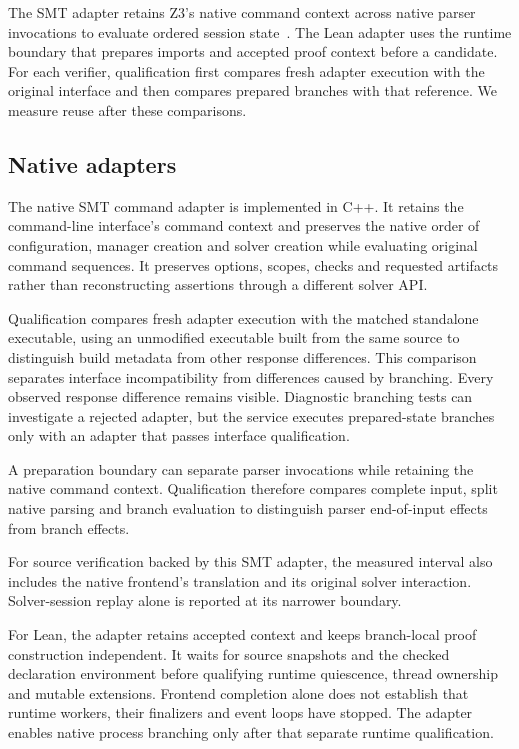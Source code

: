 \documentclass[10pt,twocolumn]{article}
\begin{document}
The SMT adapter retains Z3's native command context across native parser invocations to evaluate ordered session state~\cite{z3api}. The Lean adapter uses the runtime boundary that prepares imports and accepted proof context before a candidate. For each verifier, qualification first compares fresh adapter execution with the original interface and then compares prepared branches with that reference. We measure reuse after these comparisons.

\subsection{Native adapters}
The native SMT command adapter is implemented in C++. It retains the command-line interface's command context and preserves the native order of configuration, manager creation and solver creation while evaluating original command sequences. It preserves options, scopes, checks and requested artifacts rather than reconstructing assertions through a different solver API.

Qualification compares fresh adapter execution with the matched standalone executable, using an unmodified executable built from the same source to distinguish build metadata from other response differences. This comparison separates interface incompatibility from differences caused by branching. Every observed response difference remains visible. Diagnostic branching tests can investigate a rejected adapter, but the service executes prepared-state branches only with an adapter that passes interface qualification.

A preparation boundary can separate parser invocations while retaining the native command context. Qualification therefore compares complete input, split native parsing and branch evaluation to distinguish parser end-of-input effects from branch effects.

For source verification backed by this SMT adapter, the measured interval also includes the native frontend's translation and its original solver interaction. Solver-session replay alone is reported at its narrower boundary.

For Lean, the adapter retains accepted context and keeps branch-local proof construction independent. It waits for source snapshots and the checked declaration environment before qualifying runtime quiescence, thread ownership and mutable extensions. Frontend completion alone does not establish that runtime workers, their finalizers and event loops have stopped. The adapter enables native process branching only after that separate runtime qualification.
\end{document}
